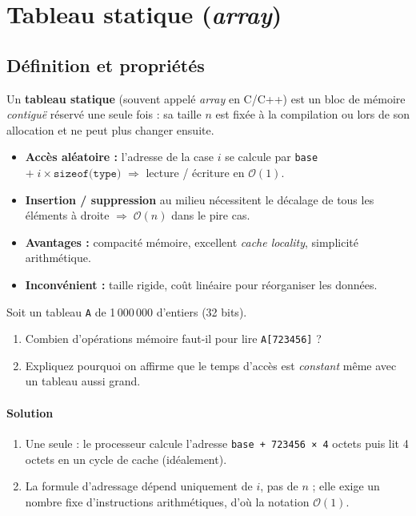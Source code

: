 \section{Tableau statique (\textit{array})}

\subsection{Définition et propriétés}

Un \textbf{tableau statique} (souvent appelé \emph{array} en C/C++)
est un bloc de mémoire \emph{contiguë} réservé une seule fois :
sa taille $n$ est fixée à la compilation ou lors de son
allocation et ne peut plus changer ensuite.
\begin{itemize}
  \item \textbf{Accès aléatoire :} l’adresse de la case $i$ se calcule par
        \texttt{base} $+\;i\times\texttt{sizeof(type)}$
        $\Rightarrow$ lecture / écriture en \(\mathcal{O}(1)\).
  \item \textbf{Insertion / suppression} au milieu nécessitent le décalage de
        tous les éléments à droite $\Rightarrow\;\mathcal{O}(n)$ dans le
        pire cas.
  \item \textbf{Avantages :} compacité mémoire, excellent \emph{cache locality},
        simplicité arithmétique.
  \item \textbf{Inconvénient :} taille rigide, coût linéaire pour
        réorganiser les données.
\end{itemize}

\begin{exercice}
Soit un tableau \lstinline|A| de 1\,000\,000 d’entiers (32 bits).
\begin{enumerate}[label=\alph*)]
  \item Combien d’opérations mémoire faut-il pour lire \lstinline|A[723456]| ?
  \item Expliquez pourquoi on affirme que le temps d’accès est \emph{constant}
        même avec un tableau aussi grand.
\end{enumerate}
\end{exercice}

\paragraph{Solution}
\begin{enumerate}[label=\alph*)]
  \item Une seule : le processeur calcule l’adresse
        \texttt{base + 723456 × 4} octets puis lit 4 octets
        en un cycle de cache (idéalement).
  \item La formule d’adressage dépend uniquement de $i$, pas de $n$ ;
        elle exige un nombre fixe d’instructions arithmétiques, d’où la
        notation \(\mathcal{O}(1)\).
\end{enumerate}

